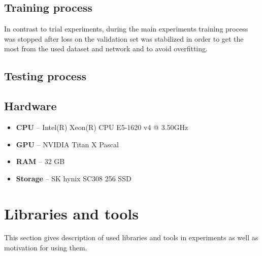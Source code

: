    \subsection{Training process}
    In contrast to trial experiments, during the main experiments training process was stopped after loss on the validation set was stabilized in order to get the most from the used dataset and network and to avoid overfitting.
    \subsection{Testing process}
    \subsection{Hardware}
    \begin{itemize}
        \item \textbf{CPU} -- Intel(R) Xeon(R) CPU E5-1620 v4 @ 3.50GHz
        \item \textbf{GPU} -- NVIDIA Titan X Pascal
        \item \textbf{RAM} -- 32 GB
        \item \textbf{Storage} -- SK hynix SC308 256 SSD
    \end{itemize}
    \label{sec:main-hw}

    
\section{Libraries and tools}
This section gives description of used libraries and tools in experiments as well as motivation for using them.

